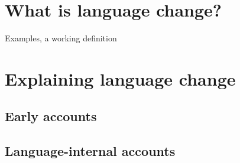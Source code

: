 \section{What is language change?}

Examples, a working definition

\section{Explaining language change}

\subsection{Early accounts}

\subsection{Language-internal accounts}


